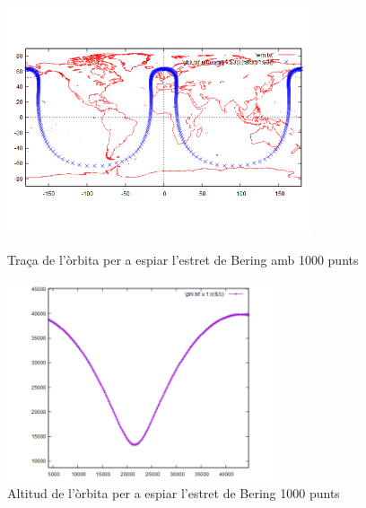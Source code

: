 \documentclass[12pt]{article}
\begin{document}
\begin{figure}
\centering
\includegraphics[width=0.8\textwidth]{orbita-beijing.png}
\caption{Traça de l'òrbita per a espiar l'estret de Bering amb 1000 punts}
\label{fig:my_label}

\includegraphics[width=0.7\textwidth]{altitud-beijing.png}
\caption{Altitud de l'òrbita per a espiar l'estret de Bering 1000 punts}
\label{fig:relacio-anomalies}
\end{figure}
\end{document}
